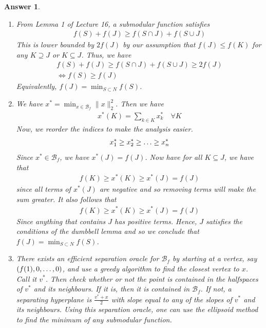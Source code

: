 \documentclass[12pt]{article}
\theoremstyle{colon}
\newtheorem*{answer}{Answer}
\begin{document}
\begin{answer}
  \leavevmode
  \begin{enumerate}[label=\alph*)]
    \item From Lemma 1 of Lecture 16, a submodular function satisfies
      \begin{gather*}
        f(S) + f(J) \geq f(S \cap J) + f(S \cup J)
      \end{gather*}
      This is lower bounded by $2 f(J)$ by our assumption that $f(J) \leq f(K)$ for any $K \supseteq J$ or $K \subseteq J$. Thus, we have
      \begin{gather*}
        f(S) + f(J) \geq f(S \cap J) + f(S \cup J) \geq 2 f(J) \\
        \Longleftrightarrow f(S) \geq f(J)
      \end{gather*}
      Equivalently, $f(J) = \min_{S \subset N} f(S)$.

    \item We have $x^* = \min_{x \in \mathcal{B}_f} \lVert x \rVert_2^2$. Then we have
      \begin{gather*}
        x^*(K) = \sum_{k \in K} x_k^* \quad \forall K
      \end{gather*}
      Now, we reorder the indices to make the analysis easier.
      \begin{gather*}
        x_1^* \geq x_2^* \geq \mathellipsis \geq x_n^*
      \end{gather*}
      Since $x^* \in \mathcal{B}_f$, we have $x^*(J) = f(J)$. Now have for all $K \subseteq J$, we have that
      \begin{gather*}
        f(K) \geq x^*(K) \geq x^*(J) = f(J)
      \end{gather*}
      since all terms of $x^*(J)$ are negative and so removing terms will make the sum greater. It also follows that
      \begin{gather*}
        f(K) \geq x^*(K) \geq x^*(J) = f(J)
      \end{gather*}
      Since anything that contains $J$ has positive terms. Hence, $J$ satisfies the conditions of the dumbbell lemma and so we conclude that $f(J) = \min_{S \subset N} f(S)$.

    \item There exists an efficient separation oracle for $\mathcal{B}_f$ by starting at a vertex, say $(f(1), 0, \mathellipsis, 0)$, and use a greedy algorithm to find the closest vertex to $x$. Call it $v^*$. Then check whether or not the point is contained in the halfspaces of $v^*$ and its neighbours. If it is, then it is contained in $\mathcal{B}_f$. If not, a separating hyperplane is $\frac{v^* + x}{2}$ with slope equal to any of the slopes of $v^*$ and its neighbours. Using this separation oracle, one can use the ellipsoid method to find the minimum of any submodular function.
  \end{enumerate}
\end{answer}
\end{document}
